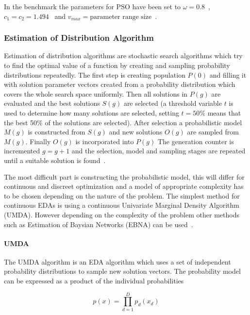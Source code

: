 In the benchmark the parameters for PSO have been set to $\omega = 0.8$~\cite{shi1998modified}, $c_1 = c_2 = 1.494$~\cite{kennedy1999small} and $v_{max} = \text{parameter range size}$~\cite{Das2008}.

\subsubsection{Estimation of Distribution Algorithm}

Estimation of distribution algorithms are stochastic search algorithms which try to find the optimal value of a function by creating and sampling probability distributions repeatedly. The first step is creating population $P(0)$ and filling it with solution parameter vectors created from a probability distribution which covers the whole search space uniformly. Then all solutions in $P(g)$ are evaluated and the best solutions $S(g)$ are selected (a threshold variable $t$ is used to determine how many solutions are selected, setting $t=50\%$ means that the best 50\% of the solutions are selected). After selection a probabilistic model $M(g)$ is constructed from $S(g)$ and new solutions $O(g)$ are sampled from $M(g)$. Finally $O(g)$ is incorporated into $P(g)$ The generation counter is incremented $g = g + 1$ and the selection, model and sampling stages are repeated until a suitable solution is found~\cite{Hauschild2011111}.

The most difficult part is constructing the probabilistic model, this will differ for continuous and discreet optimization and a model of appropriate complexity has to be chosen depending on the nature of the problem. The simplest method for continuous EDAs is using a continuous Univariate Marginal Density Algorithm (UMDA). However depending on the complexity of the problem other methods such as Estimation of Baysian Networks (EBNA) can be used~\cite{larranaga2012review}.

\paragraph{UMDA}
The UMDA algorithm is an EDA algorithm which uses a set of independent probability distributions to sample new solution vectors. The probability model can be expressed as a product of the individual probabilities

\begin{equation}
  p(x) = \prod _{d=1}^D {p_d(x_d)}
\end{equation}


